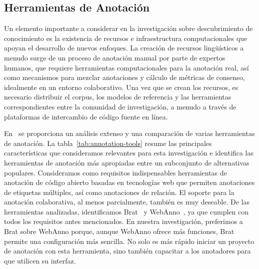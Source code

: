 \subsection{Herramientas de Anotación}\label{subsec:annotation-tools}

Un elemento importante a considerar en la investigación sobre descubrimiento de conocimiento es la existencia de recursos e infraestructura computacionales que apoyan el desarrollo de nuevos enfoques.
La creación de recursos lingüísticos a menudo surge de un proceso de anotación manual por parte de expertos humanos, que requiere herramientas computacionales para la anotación real, así como mecanismos para mezclar anotaciones y cálculo de métricas de consenso, idealmente en un entorno colaborativo.
Una vez que se crean los recursos, es necesario distribuir el corpus, los modelos de referencia y las herramientas correspondientes entre la comunidad de investigación, a menudo a través de plataformas de intercambio de código fuente en línea.

En~\citet{annotation-tools} se proporciona un análisis extenso y una comparación de varias herramientas de anotación.
La tabla~\ref{tab:annotation-tools} resume las principales características que consideramos relevantes para esta investigación e identifica las herramientas de anotación más apropiadas entre un subconjunto de alternativas populares.
Consideramos como requisitos indispensables herramientas de anotación de código abierto basadas en tecnologías web que permiten anotaciones de etiquetas múltiples, así como anotaciones de relación.
El soporte para la anotación colaborativa, al menos parcialmente, también es muy deseable.
De las herramientas analizadas, identificamos Brat~\cite{brat} y WebAnno~\cite{webanno}, ya que cumplen con todos los requisitos antes mencionados.
En nuestra investigación, preferimos a Brat sobre WebAnno porque, aunque WebAnno ofrece más funciones, Brat permite una configuración más sencilla.
No solo es más rápido iniciar un proyecto de anotación con esta herramienta, sino también capacitar a los anotadores para que utilicen su interfaz.

